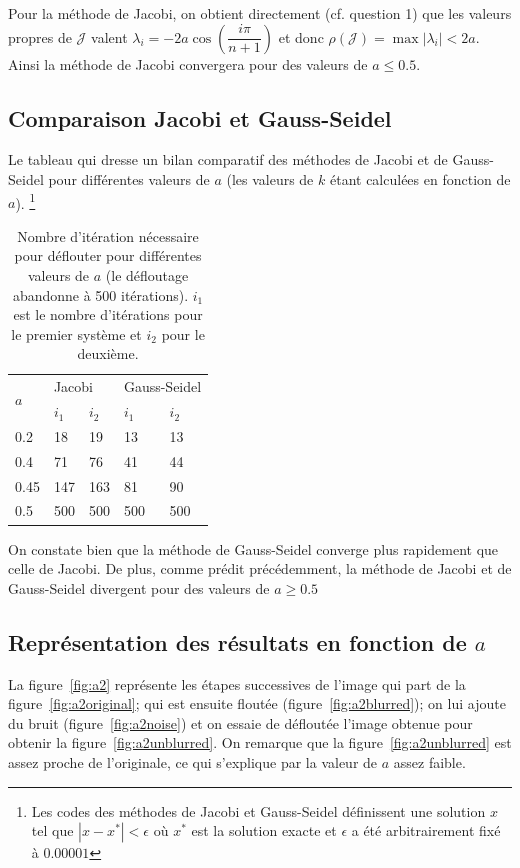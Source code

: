 Pour la méthode de Jacobi, on obtient directement (cf. question 1) que les valeurs propres de $\mathcal{J}$ valent
$\lambda _i = -2a \cos(\dfrac{i \pi}{n+1})$ et donc $\rho(\mathcal{J}) = \max |\lambda_i| < 2a$.
Ainsi la méthode de Jacobi convergera pour des valeurs de $a \leq 0.5$.


\subsection{Comparaison Jacobi et Gauss-Seidel}
Le tableau qui dresse un bilan comparatif des méthodes de Jacobi et de Gauss-Seidel pour différentes valeurs de $a$ (les valeurs de $k$ étant calculées en fonction de $a$).
\footnote{Les codes des méthodes de Jacobi et Gauss-Seidel définissent une solution $x$
tel que $|x-x^*|<\epsilon$ où $x^*$ est la solution exacte et $\epsilon$ a été arbitrairement fixé à $0.00001$}
\begin{table}
  \centering
  \begin{tabular}{|l|l|l|l|l|}
    \hline
    \multirow{2}{*}{$a$} & \multicolumn{2}{l|}{Jacobi} & \multicolumn{2}{l|}{Gauss-Seidel}\\
    \cline{2-5}
        & $i_1$ & $i_2$ & $i_1$ & $i_2$\\
    \hline
    0.2 & 18    & 19    & 13    & 13\\
    \hline
    0.4 & 71    & 76    & 41    & 44\\
    \hline
    0.45& 147   & 163   & 81    & 90\\
    \hline
    0.5 & 500   & 500   & 500   & 500\\
    \hline
  \end{tabular}
  \caption{Nombre d'itération nécessaire pour déflouter pour différentes valeurs de $a$ (le défloutage abandonne à 500 itérations).
  $i_1$ est le nombre d'itérations pour le premier système et $i_2$ pour le deuxième.}
  \label{tab:iter}
\end{table}
On constate bien que la méthode de Gauss-Seidel converge plus rapidement que celle de Jacobi. De plus, comme prédit précédemment, la méthode de Jacobi et de Gauss-Seidel divergent pour des valeurs de $a \geq 0.5$



\subsection{Représentation des résultats en fonction de $a$}
La figure~\ref{fig:a2} représente les étapes successives de l'image qui part
de la figure~\ref{fig:a2original}; qui est ensuite floutée (figure~\ref{fig:a2blurred});
on lui ajoute du bruit (figure~\ref{fig:a2noise}) et on essaie de défloutée l'image obtenue pour
obtenir la figure~\ref{fig:a2unblurred}.
On remarque que la figure~\ref{fig:a2unblurred} est assez proche de l'originale, ce qui s'explique par la valeur de $a$ assez faible.

